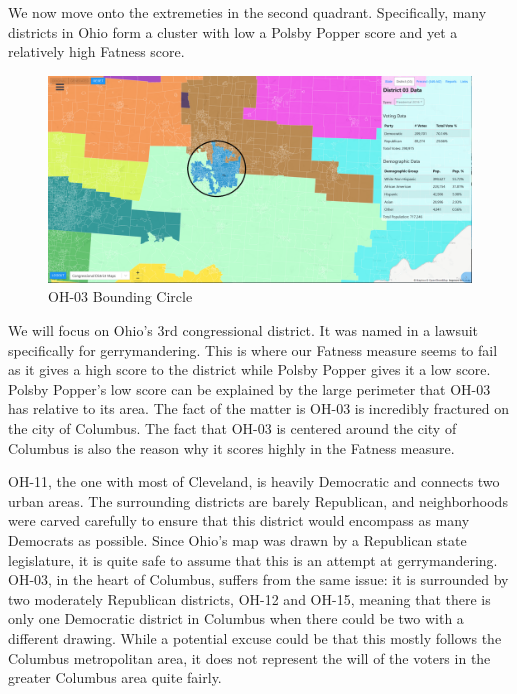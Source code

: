 \documentclass[letterpaper]{article}
\begin{document}
We now move onto the extremeties in the second quadrant. Specifically, many districts in Ohio form a cluster with low a Polsby Popper score and yet a relatively high Fatness score.

\begin{figure}[H]
	\includegraphics[width=\linewidth]{./figures/OH-03-BoundingCircle.png}
	\caption{OH-03 Bounding Circle}
	\label{fig:oh03boundingCircle}
\end{figure}

We will focus on Ohio's 3rd congressional district. It was named in a lawsuit specifically for gerrymandering. This is where our Fatness measure seems to fail as it gives a high score to the district while Polsby Popper gives it a low score. Polsby Popper's low score can be explained by the large perimeter that OH-03 has relative to its area. The fact of the matter is OH-03 is incredibly fractured on the city of Columbus. The fact that OH-03 is centered around the city of Columbus is also the reason why it scores highly in the Fatness measure.

OH-11, the one with most of Cleveland, is heavily Democratic and connects two urban areas. The surrounding districts are barely Republican, and neighborhoods were carved carefully to ensure that this district would encompass as many Democrats as possible. Since Ohio’s map was drawn by a Republican state legislature, it is quite safe to assume that this is an attempt at gerrymandering. OH-03, in the heart of Columbus, suffers from the same issue: it is surrounded by two moderately Republican districts, OH-12 and OH-15, meaning that there is only one Democratic district in Columbus when there could be two with a different drawing.  While a potential excuse could be that this mostly follows the Columbus metropolitan area, it does not represent the will of the voters in the greater Columbus area quite fairly. 
\end{document}
